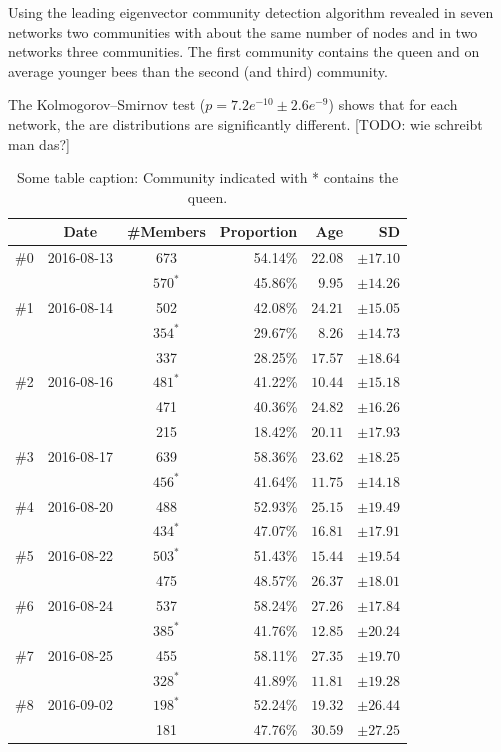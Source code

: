 Using the leading eigenvector community detection algorithm revealed in seven networks two communities with about the same number of nodes and in two networks three communities. The first community contains the queen and on average younger bees than the second (and third) community.

The Kolmogorov–Smirnov  test ($p=7.2e^{-10} \pm2.6e^{-9}$) shows that for each network, the are distributions are significantly different. [TODO: wie schreibt man das?]

\begin{table}
\centering
\begin{tabularx}{0.8\textwidth}{lccrrr}
	\toprule
	{} & Date & \#Members & Proportion & Age & SD\\
	\midrule
	\#0 & 2016-08-13 & 673     & 54.14\% & $22.08$ & $\pm17.10$ \\
	  &            & $570^*$ & 45.86\% & $9.95$ & $\pm14.26$ \\
	\midrule 
	\#1 & 2016-08-14 & 502     & 42.08\% & $24.21$ & $\pm15.05$ \\
	  &			   & $354^*$ & 29.67\% &  $8.26$ & $\pm14.73$ \\
	  &			   & 337     & 28.25\% & $17.57$ & $\pm18.64$ \\
	\midrule     
	\#2 & 2016-08-16 & $481^*$ & 41.22\% & $10.44$ & $\pm15.18$ \\
	  &		       & 471     & 40.36\% & $24.82$ & $\pm16.26$ \\
	  &		       & 215     & 18.42\% & $20.11$ & $\pm17.93$ \\
	\midrule  
	\#3 & 2016-08-17 & 639     & 58.36\% & $23.62$ & $\pm18.25$ \\
	  &            & $456^*$ & 41.64\% & $11.75$ & $\pm14.18$ \\
	\midrule   
	\#4 & 2016-08-20 & 488     & 52.93\% & $25.15$ & $\pm19.49$ \\
	  &            & $434^*$ & 47.07\% & $16.81$ & $\pm17.91$ \\
	\midrule   							
	\#5 & 2016-08-22 & $503^*$ & 51.43\% & $15.44$ & $\pm19.54$ \\
	  &            & 475     & 48.57\% & $26.37$ & $\pm18.01$ \\
	\midrule  
	\#6 & 2016-08-24 & 537     & 58.24\% & $27.26$ & $\pm17.84$ \\
	  &            & $385^*$ & 41.76\% & $12.85$ & $\pm20.24$ \\
	\midrule  
	\#7 & 2016-08-25 & 455     & 58.11\% & $27.35$ & $\pm19.70$ \\
	  &            & $328^*$ & 41.89\% & $11.81$ & $\pm19.28$ \\
	\midrule 
	\#8 & 2016-09-02 & $198^*$ & 52.24\% & $19.32$ & $\pm26.44$ \\
	  &            & 181     & 47.76\% & $30.59$ & $\pm27.25$ \\
	\bottomrule
\end{tabularx}
\caption{Some table caption: Community indicated with * contains the queen.}
\label{tab:communities}
\end{table}

